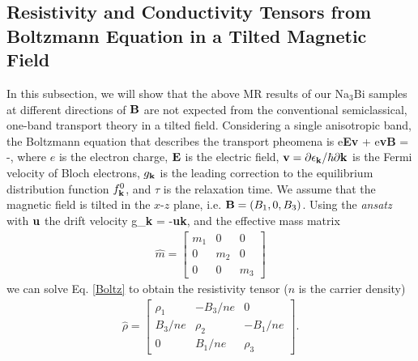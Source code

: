 \subsection{Resistivity and Conductivity Tensors from Boltzmann Equation in a Tilted Magnetic Field}
In this subsection, we will show that the above MR results of our Na$_3$Bi samples at different directions of $\bf B$ are not expected from the conventional semiclassical, one-band transport theory in a tilted field. Considering a single anisotropic band, the Boltzmann equation that describes the transport pheomena is
\be
e{\bf E\cdot v} + e{\bf v\times B}\cdot{} 
= -,
\label{Boltz}
\ee
where $e$ is the electron charge, $\bf E$ is the electric field, $\bf v = \partial\epsilon_{\bf k}/\hbar\partial {\bf k}$ is the Fermi velocity of Bloch electrons, $g_{\bf k}$ is the leading correction to the equilibrium distribution function $f^0_{\bf k}$, and $\tau$ is the relaxation time. We assume that the magnetic field is tilted in the $x$-$z$ plane, i.e. ${\bf B} = (B_1, 0, B_3)$. Using the \emph{ansatz} with $\bf u$ the drift velocity
\be
g_{\bf k} = -{\bf u\cdot k},
\ee
and the effective mass matrix
\begin{eqnarray}
\hat{m} = \left[   \begin{array}{ccc}
		m_1   &   0   &   0 \\
		0      &    m_2 &   0 \\
		0     &    0     &   m_3   \end{array}\right]
\end{eqnarray}
we can solve Eq. \ref{Boltz} to obtain the resistivity tensor ($n$ is the carrier density)
\begin{eqnarray}
\hat{\rho} = 
						\left[  	\begin{array}{ccc}
								\rho_1	&  -B_3/ne   &   0  \\
								B_3/ne  &   \rho_2   &   -B_1/ne \\
								0          &   B_1/ne   &   \rho_3   
								\end{array}
								\right].
				\label{rhoij}
				\end{eqnarray}
				

